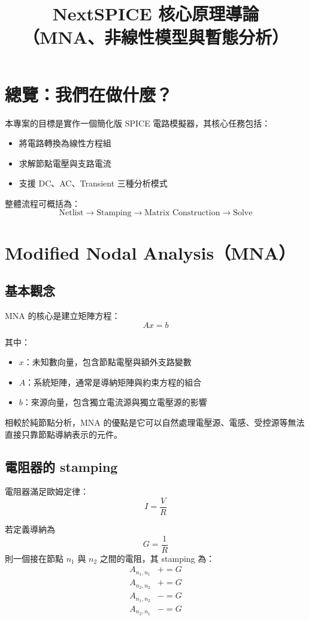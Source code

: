 \documentclass[12pt,a4paper]{article}
\title{NextSPICE 核心原理導論\\\large（MNA、非線性模型與暫態分析）}
\author{}
\date{}
\begin{document}
\maketitle

\section{總覽：我們在做什麼？}

本專案的目標是實作一個簡化版 SPICE 電路模擬器，其核心任務包括：

\begin{itemize}
\item 將電路轉換為線性方程組
\item 求解節點電壓與支路電流
\item 支援 DC、AC、Transient 三種分析模式
\end{itemize}

整體流程可概括為：
\[
\text{Netlist} \rightarrow \text{Stamping} \rightarrow \text{Matrix Construction} \rightarrow \text{Solve}
\]

\section{Modified Nodal Analysis（MNA）}

\subsection{基本觀念}

MNA 的核心是建立矩陣方程：
\[
A x = b
\]

其中：
\begin{itemize}
\item $x$：未知數向量，包含節點電壓與額外支路變數
\item $A$：系統矩陣，通常是導納矩陣與約束方程的組合
\item $b$：來源向量，包含獨立電流源與獨立電壓源的影響
\end{itemize}

相較於純節點分析，MNA 的優點是它可以自然處理電壓源、電感、受控源等無法直接只靠節點導納表示的元件。

\subsection{電阻器的 stamping}

電阻器滿足歐姆定律：
\[
I = \frac{V}{R}
\]

若定義導納為
\[
G = \frac{1}{R}
\]
則一個接在節點 $n_1$ 與 $n_2$ 之間的電阻，其 stamping 為：
\[
\begin{aligned}
A_{n_1,n_1} &\mathrel{+}= G \\
A_{n_2,n_2} &\mathrel{+}= G \\
A_{n_1,n_2} &\mathrel{-}= G \\
A_{n_2,n_1} &\mathrel{-}= G
\end{aligned}
\]
\end{document}
